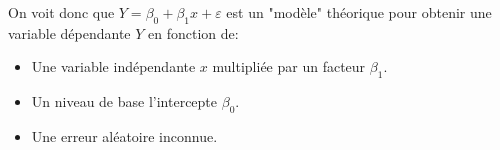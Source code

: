 \documentclass[10pt, french]{article}
\begin{document}
\begin{multicols*}{2}
On voit donc que $Y = \beta_{0} + \beta_{1} x + \varepsilon$ est un "modèle" théorique pour obtenir une variable dépendante $Y$ en fonction de: 
\begin{itemize}
	\item	Une variable indépendante $x$ multipliée par un facteur $\beta_{1}$.
	\item	Un niveau de base l'intercepte $\beta_{0}$.
	\item	Une erreur aléatoire inconnue.
\end{itemize}

\end{multicols*}
\end{document}
